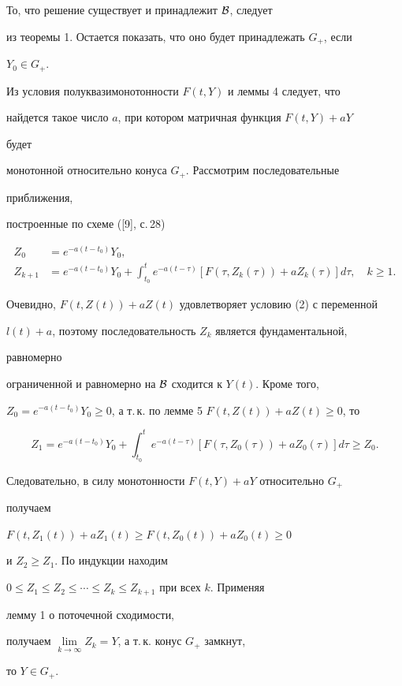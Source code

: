\begin{pf} 


То, что решение существует и принадлежит $\cal B$, следует 


из теоремы 1. Остается показать, что оно будет принадлежать $G_+$, если 


$Y_0\in G_+$. 


 


Из условия полуквазимонотонности $F(t,Y)$ и леммы 4 следует, что 


найдется такое число $a$, при котором матричная функция $F(t,Y)+a Y$ 


будет 


монотонной относительно конуса $G_+$. Рассмотрим последовательные 


приближения, 


построенные по схеме ([9], с.\,28) 


\begin{align*} 


Z_0&=e^{-a(t-t_0)}Y_0,\\ 


% 


Z_{k+1}&=e^{-a(t-t_0)}Y_0+\int^t_{t_0} 


e^{-a(t-\tau)}[F(\tau,Z_k(\tau))+ 


a Z_k(\tau)]d\tau,\quad k\ge1. 


\end{align*} 


Очевидно, $F(t,Z(t))+a Z(t)$ удовлетворяет условию (2) с переменной 


$l(t)+a$, поэтому последовательность $Z_k$ является фундаментальной, 


равномерно 


ограниченной и равномерно на $\cal B$ сходится к $Y(t)$. Кроме того, 


$Z_0=e^{-a(t-t_0)}Y_0\ge0$, а т.\,к. по лемме 5\; $F(t,Z(t))+a 


Z(t)\ge0$, то 


$$ 


Z_1=e^{-a(t-t_0)}Y_0+\int^t_{t_0}e^{-a(t-\tau)} 


[F(\tau,Z_0(\tau))+a Z_0(\tau)]d\tau\ge Z_0. 


$$ 


Следовательно, в силу монотонности $F(t,Y)+a Y$ относительно $G_+$ 


получаем 


$F(t,Z_1(t))+a Z_1(t)\ge F(t,Z_0(t))+a Z_0(t)\ge0$ 


и $Z_2\ge Z_1$. По индукции находим 


$0\le Z_1\le Z_2\le\dotsb\le Z_k\le Z_{k+1}$ при всех $k$. Применяя 


лемму 1 о поточечной сходимости, 


получаем $\lim\limits_{k\to\infty}Z_k=Y$, а т.\,к. конус $G_+$ замкнут, 


то $Y\in G_+$. 


\end{pf} 


